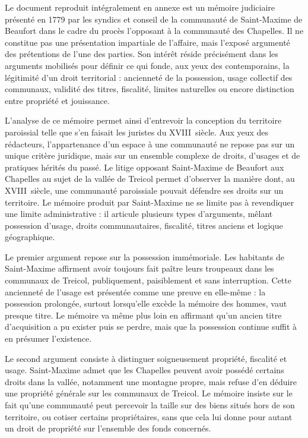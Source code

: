 \documentclass[12pt,a4paper]{report}
\begin{document}
	Le document reproduit intégralement en annexe est un mémoire judiciaire présenté en 1779 par les syndics et conseil de la communauté de Saint-Maxime de Beaufort dans le cadre du procès l'opposant à la communauté des Chapelles. Il ne constitue pas une présentation impartiale de l'affaire, mais l'exposé argumenté des prétentions de l'une des parties. Son intérêt réside précisément dans les arguments mobilisés pour définir ce qui fonde, aux yeux des contemporains, la légitimité d'un droit territorial : ancienneté de la possession, usage collectif des communaux, validité des titres, fiscalité, limites naturelles ou encore distinction entre propriété et jouissance.
	
	L'analyse de ce mémoire permet ainsi d'entrevoir la conception du territoire paroissial telle  que s'en faisait les juristes du XVIII\ieme\ siècle. Aux yeux des rédacteurs, l'appartenance d'un espace à une communauté ne repose pas sur un unique critère juridique, mais sur un ensemble complexe de droits, d'usages et de pratiques hérités du passé.
	Le litige opposant Saint-Maxime de Beaufort aux Chapelles au sujet de la vallée de Treicol permet d'observer la manière dont, au XVIII\ieme\ siècle, une communauté paroissiale pouvait défendre ses droits sur un territoire. Le mémoire produit par Saint-Maxime ne se limite pas à revendiquer une limite administrative : il articule plusieurs types d'arguments, mêlant possession d'usage, droits communautaires, fiscalité, titres anciens et logique géographique.
	
	Le premier argument repose sur la possession immémoriale. Les habitants de Saint-Maxime affirment avoir toujours fait paître leurs troupeaux dans les communaux de Treicol, publiquement, paisiblement et sans interruption. Cette ancienneté de l'usage est présentée comme une preuve en elle-même : la possession prolongée, surtout lorsqu'elle excède la mémoire des hommes, vaut presque titre. Le mémoire va même plus loin en affirmant qu'un ancien titre d'acquisition a pu exister puis se perdre, mais que la possession continue suffit à en présumer l'existence.
	
	Le second argument consiste à distinguer soigneusement propriété, fiscalité et usage. Saint-Maxime admet que les Chapelles peuvent avoir possédé certains droits dans la vallée, notamment une montagne propre, mais refuse d'en déduire une propriété générale sur les communaux de Treicol. Le mémoire insiste sur le fait qu'une communauté peut percevoir la taille sur des biens situés hors de son territoire, ou cotiser certains propriétaires, sans que cela lui donne pour autant un droit de propriété sur l'ensemble des fonds concernés. 
	
\end{document}
